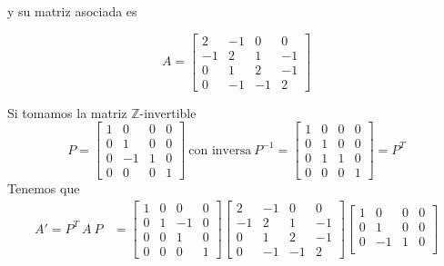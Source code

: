 \begin{example}
\newpage
y su matriz asociada es
\begin{center}
\begin{equation*}
    A = \begin{bmatrix}
    2 & -1  &  0 &  0\\
   -1 &  2  &  1 & -1\\
    0 &  1  &  2 & -1 \\
    0 & -1  & -1 &  2
    \end{bmatrix}
\end{equation*}
\end{center}
Si tomamos la matriz $\mathbb{Z}$-invertible
\begin{equation*}
P = \begin{bmatrix}
   1 &  0  & 0 & 0\\
   0 &  1  & 0 & 0\\
   0 & -1  & 1 & 0 \\
   0 &  0  & 0 & 1
      \end{bmatrix}~ \text{con inversa} ~ P^{-1} =  \begin{bmatrix}
   1 &  0  & 0 & 0\\
   0 &  1  & 0 & 0\\
   0 &  1  & 1 & 0 \\
   0 &  0  & 0 & 1
           \end{bmatrix} = P^{T}
\end{equation*}
Tenemos que 
\begin{equation*}
\begin{split}
A' = P^{T}~A~P & = \begin{bmatrix}
                1 &  0  &  0 & 0\\
                0 &  1  & -1 & 0\\
                0 &  0  &  1 & 0 \\
                0 &  0  &  0 & 1
             \end{bmatrix}
             \begin{bmatrix}
                2 & -1  &  0 &  0\\
               -1 &  2  &  1 & -1\\
                0 &  1  &  2 & -1 \\
                0 & -1  & -1 &  2
           \end{bmatrix}
           \begin{bmatrix}
                1 &  0  & 0 & 0\\
                0 &  1  & 0 & 0\\
                0 & -1  & 1 & 0 \\

\end{bmatrix}
\end{split}
\end{equation*}
\end{example}
